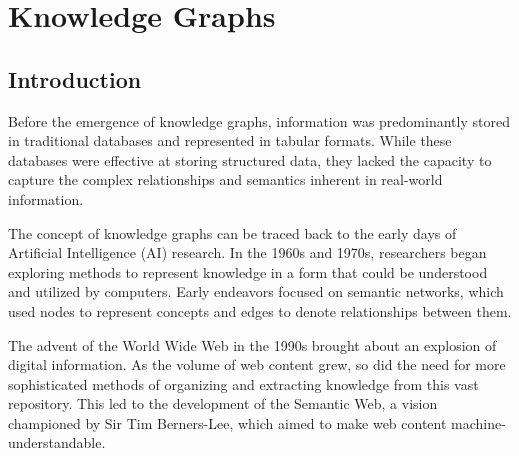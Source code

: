 \chapter{Knowledge Graphs}\label{chap:kgs}




\section{Introduction}\label{sec:kgs-intro}

Before the emergence of knowledge graphs, information was predominantly stored in traditional databases and represented in tabular formats. While these databases were effective at storing structured data, they lacked the capacity to capture the complex relationships and semantics inherent in real-world information.

The concept of knowledge graphs can be traced back to the early days of Artificial Intelligence (AI) research. In the 1960s and 1970s, researchers began exploring methods to represent knowledge in a form that could be understood and utilized by computers. Early endeavors focused on semantic networks, which used nodes to represent concepts and edges to denote relationships between them.

The advent of the World Wide Web in the 1990s brought about an explosion of digital information. As the volume of web content grew, so did the need for more sophisticated methods of organizing and extracting knowledge from this vast repository. This led to the development of the Semantic Web, a vision championed by Sir Tim Berners-Lee, which aimed to make web content machine-understandable.

